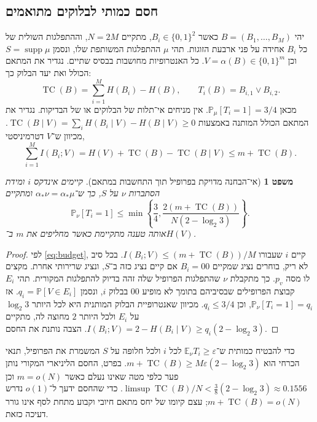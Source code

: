 \documentclass[11pt,a4paper]{article}
\newtheorem{theorem}{משפט}[section]
\theoremstyle{definition}
\theoremstyle{remark}
\newcommand{\TC}{\operatorname{TC}}
\newcommand{\supp}{\operatorname{supp}}
\newcommand{\bits}{\{0,1\}}
\newcommand{\Prb}{\mathbb P}
\newcommand{\gap}{2-\log_2 3}
\begin{document}
\subsection{חסם כמותי לבלוקים מתואמים}
יהי $B=(B_1,\ldots,B_M)$ כאשר $B_i\in\bits^2$, מתקיים $N=2M$, וההתפלגות השולית של כל $B_i$ אחידה על פני ארבעת הזוגות. תהי $\mu$ ההתפלגות המשותפת שלו, ונסמן $S=\supp\mu$ וכן $V=\alpha(B)\in\bits^m$. כל האנטרופיות מחושבות בבסיס שתיים. נגדיר את המתאם הכולל \cite{watanabe,cover} ואת יעד הבלוק כך:
\[
\TC(B)=\sum_{i=1}^M H(B_i)-H(B),\qquad
T_i(B)=B_{i,1}\lor B_{i,2}.
\]
מכאן $\Prb_\mu[T_i=1]=3/4$. אין מניחים אי־תלות של הבלוקים או של הבדיקות. נגדיר את המתאם הכולל המותנה באמצעות $\TC(B\mid V)=\sum_iH(B_i\mid V)-H(B\mid V)\ge0$. מכיוון ש־$V$ דטרמיניסטי,
\begin{equation}\label{eq:budget}
\sum_{i=1}^M I(B_i;V)=H(V)+\TC(B)-\TC(B\mid V)\le m+\TC(B).
\end{equation}
\begin{theorem}[אי־הבחנה מדויקת בפרופיל תוך התחשבות במתאם]\label{thm:alias}
קיימים אינדקס $i$ ומידת הסתברות $\nu$ על $S$, כך ש־$\alpha_*\nu=\alpha_*\mu$ ומתקיים
\begin{equation}\label{eq:linear}
\Prb_\nu[T_i=1]\le\min\left\{\frac34,\frac{2(m+\TC(B))}{N(\gap)}\right\}.
\end{equation}
אותה טענה מתקיימת כאשר מחליפים את $m$ ב־$H(V)$.
\end{theorem}
\begin{proof}
לפי \eqref{eq:budget}, קיים $i$ שעבורו $I(B_i;V)\le (m+\TC(B))/M$. בכל סיב לא ריק, בוחרים נציג שמקיים $B_i=00$ אם קיים נציג כזה ב־$S$, ונציג שרירותי אחרת. מקצים לו מסה $p_v$. כך מתקבלת $\nu$ שהתפלגות הפרופיל שלה זהה בדיוק להתפלגות המקורית. תהי $E_i$ קבוצת הפרופילים שבסיביהם בתומך לא מופיע $00$ בבלוק $i$, ונסמן $q_i=\Prb[V\in E_i]$. אז $\Prb_\nu[T_i=1]=q_i$, וכן $q_i\le3/4$. מכיוון שאנטרופיית הבלוק המותנית היא לכל היותר $\log_2 3$ על $E_i$ ולכל היותר $2$ מחוצה לה, מתקיים $I(B_i;V)=2-H(B_i\mid V)\ge q_i(2-\log_2 3)$. הצבה נותנת את החסם.
\end{proof}
כדי להבטיח כמותית ש־$\mathbb E_\nu T_i\ge\varepsilon$ לכל $i$ ולכל חלופה על $S$ המשמרת את הפרופיל, תנאי הכרחי הוא $m+\TC(B)\ge M\varepsilon(2-\log_2 3)$. בפרט, החסם הליניארי המקורי נותן פער כלפי מטה שאינו נעלם כאשר $m=o(N)$ וכן $\limsup\TC(B)/N < \tfrac38(2-\log_2 3)\approx0.1556$. כדי שהחסם ידעך ל־$o(1)$ נדרש $m+\TC(B)=o(N)$; עצם קיומו של יחס מתאם חיובי וקבוע מתחת לסף אינו גורר דעיכה כזאת.
\end{document}
